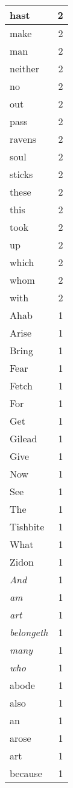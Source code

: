\begin{center}
\begin{longtable}{l|r}
hast & 2 \\ \hline
make & 2 \\ \hline
man & 2 \\ \hline
neither & 2 \\ \hline
no & 2 \\ \hline
out & 2 \\ \hline
pass & 2 \\ \hline
ravens & 2 \\ \hline
soul & 2 \\ \hline
sticks & 2 \\ \hline
these & 2 \\ \hline
this & 2 \\ \hline
took & 2 \\ \hline
up & 2 \\ \hline
which & 2 \\ \hline
whom & 2 \\ \hline
with & 2 \\ \hline
Ahab & 1 \\ \hline
Arise & 1 \\ \hline
Bring & 1 \\ \hline
Fear & 1 \\ \hline
Fetch & 1 \\ \hline
For & 1 \\ \hline
Get & 1 \\ \hline
Gilead & 1 \\ \hline
Give & 1 \\ \hline
Now & 1 \\ \hline
See & 1 \\ \hline
The & 1 \\ \hline
Tishbite & 1 \\ \hline
What & 1 \\ \hline
Zidon & 1 \\ \hline
\emph{And} & 1 \\ \hline
\emph{am} & 1 \\ \hline
\emph{art} & 1 \\ \hline
\emph{belongeth} & 1 \\ \hline
\emph{many} & 1 \\ \hline
\emph{who} & 1 \\ \hline
abode & 1 \\ \hline
also & 1 \\ \hline
an & 1 \\ \hline
arose & 1 \\ \hline
art & 1 \\ \hline
because & 1 \\ \hline

\end{longtable}
\end{center}
